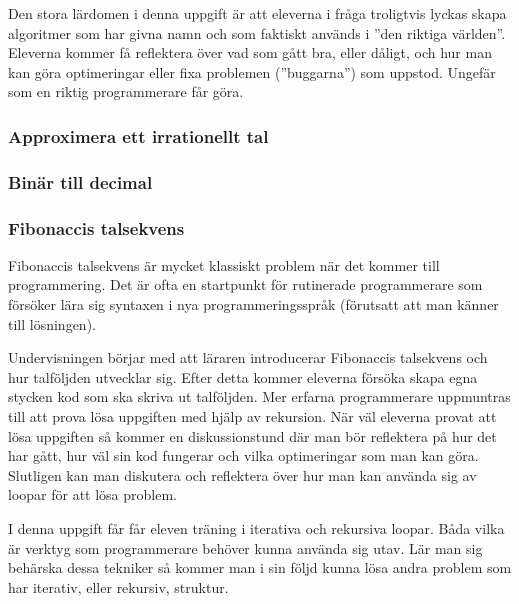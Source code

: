     \textcolor{WildStrawberry}{
        Den stora lärdomen i denna uppgift är att eleverna i fråga troligtvis lyckas skapa algoritmer som har givna namn och som faktiskt används i ''den riktiga världen''.  Eleverna kommer få reflektera över vad som gått bra, eller dåligt, och hur man kan göra optimeringar eller fixa problemen (''buggarna'') som uppstod. Ungefär som en riktig programmerare får göra. \todo{:)}}
        
\subsubsection{Approximera ett irrationellt tal}
    \label{sec:approx}

\subsubsection{Binär till decimal}
    \label{sec:binar}
    
\subsubsection{Fibonaccis talsekvens}
    \label{sec:Fibonacci}
    
    \textcolor{WildStrawberry}{
        Fibonaccis talsekvens är mycket klassiskt problem när det kommer till programmering. Det är ofta en startpunkt för rutinerade programmerare som försöker lära sig syntaxen i nya programmeringsspråk (förutsatt att man känner till lösningen). }
        
    \textcolor{WildStrawberry}{
        Undervisningen börjar med att läraren introducerar Fibonaccis talsekvens och hur talföljden utvecklar sig. Efter detta kommer eleverna försöka skapa egna stycken kod som ska skriva ut talföljden. Mer erfarna programmerare uppmuntras till att prova lösa uppgiften med hjälp av rekursion. När väl eleverna provat att lösa uppgiften så kommer en diskussionstund där man bör reflektera på hur det har gått, hur väl sin kod fungerar och vilka optimeringar som man kan göra. Slutligen kan man diskutera och reflektera över hur man kan använda sig av loopar för att lösa problem.}
        
    \textcolor{WildStrawberry}{
        I denna uppgift får får eleven träning i iterativa och rekursiva loopar. Båda vilka är verktyg som programmerare behöver kunna använda sig utav. Lär man sig behärska dessa tekniker så kommer man i sin följd kunna lösa andra problem som har iterativ, eller rekursiv, struktur.}
        
